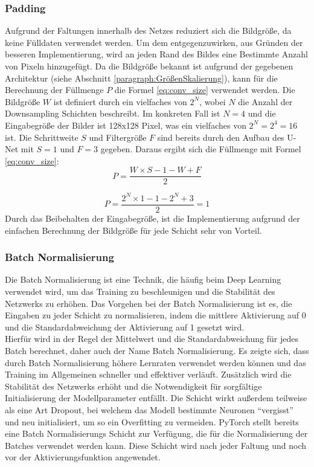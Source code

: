 \subsubsection{Padding}
Aufgrund der Faltungen innerhalb des Netzes reduziert sich die Bildgröße, da keine Fülldaten verwendet werden. Um dem entgegenzuwirken, aus Gründen der besseren Implementierung, wird an jeden Rand des Bildes eine Bestimmte Anzahl von Pixeln hinzugefügt. Da die Bildgröße bekannt ist aufgrund der gegebenen Architektur (siehe Abschnitt \ref{paragraph:GrößenSkalierung}), kann für die Berechnung der Füllmenge $P$ die Formel \ref{eq:conv_size} verwendet werden. Die Bildgröße $W$ ist definiert durch ein vielfaches von $2^N$, wobei $N$ die Anzahl der Downsampling Schichten beschreibt. Im konkreten Fall ist $N=4$ und die Eingabegröße der Bilder ist 128x128 Pixel, was ein vielfaches von $2^N=2^4=16$ ist. Die Schrittweite $S$ und Filtergröße $F$ sind bereits durch den Aufbau des U-Net mit $S=1$ und $F=3$ gegeben. Daraus ergibt sich die Füllmenge mit Formel \ref{eq:conv_size}:
\begin{equation}
	P = \dfrac{W \times S - 1 - W + F}{2}
\end{equation}

\begin{equation}
	P = \dfrac{2^N \times 1 - 1 - 2^N + 3}{2}  = 1
\end{equation}
Durch das Beibehalten der Eingabegröße, ist die Implementierung aufgrund der einfachen Berechnung der Bildgröße für jede Schicht sehr von Vorteil. 

\subsubsection{Batch Normalisierung}
Die Batch Normalisierung ist eine Technik, die häufig beim Deep Learning verwendet wird, um das Training zu beschleunigen und die Stabilität des Netzwerks zu erhöhen. Das Vorgehen bei der Batch Normalisierung ist es, die Eingaben zu jeder Schicht zu normalisieren, indem die mittlere Aktivierung auf 0 und die Standardabweichung der Aktivierung auf 1 gesetzt wird.\\
Hierfür wird in der Regel der Mittelwert und die Standardabweichung für jedes Batch berechnet, daher auch der Name Batch Normalisierung. Es zeigte sich, dass durch Batch Normalisierung höhere Lernraten verwendet werden können und das Training im Allgemeinen schneller und effektiver verläuft. Zusätzlich wird die Stabilität des Netzwerks erhöht und die Notwendigkeit für sorgfältige Initialisierung der Modellparameter entfällt. Die Schicht wirkt außerdem teilweise als eine Art Dropout, bei welchem das Modell bestimmte Neuronen ``vergisst'' und neu initialisiert, um so ein Overfitting zu vermeiden.\cite[vgl.][]{Ioffe2015}
PyTorch stellt bereits eine Batch Normalisierungs Schicht zur Verfügung, die für die Normalisierung der Batches verwendet werden kann. Diese Schicht wird nach jeder Faltung und noch vor der Aktivierungsfunktion angewendet.

